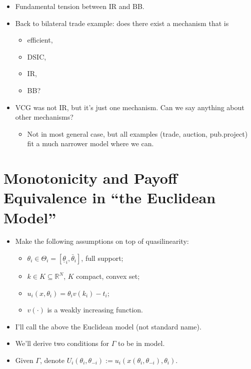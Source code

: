 \documentclass[english]{beamer}		%
\def\lyxframeend{} %
\begin{document}
\begin{itemize}
	\item Fundamental tension between IR and BB.
	\item Back to bilateral trade example: does there exist a mechanism that is
	\begin{itemize}
		\item efficient,
		\item DSIC,
		\item IR,
		\item BB?
	\end{itemize}
	\pause
	\item VCG was not IR, but it's just one mechanism. Can we say anything about other mechanisms?
	\begin{itemize}
		\item Not in most general case, but all examples (trade, auction, pub.project) fit a much narrower model where we can.
	\end{itemize}
\end{itemize}
\lyxframeend





\section{Monotonicity and Payoff Equivalence in ``the Euclidean Model''}

\begin{itemize}
	\item Make the following assumptions on top of quasilinearity:
	\begin{itemize}
		\item $\theta_i \in \Theta_{i} = [\underline{\theta}_i, \bar{\theta}_i]$, full support;
		\item $k \in K \subseteq \mathbb{R}^N$, $K$ compact, convex set;
		\item $u_i(x,\theta_i) = \theta_i v(k_i) - t_i$;
		\item $v(\cdot)$ is a weakly increasing function.
	\end{itemize}
	\item I'll call the above \alert{the Euclidean model} (not standard name).
	\item We'll derive two  conditions for $\Gamma$ to be  in  model.
	\item Given $\Gamma$, denote $U_i(\theta_i, \theta_{-i}) := u_i\left(x(\theta_i, \theta_{-i}), \theta_i \right)$.
\end{itemize}
\lyxframeend
\end{document}
